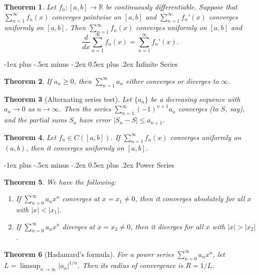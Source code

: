 \documentclass[10pt,landscape]{article}
\makeatletter
\newtheorem{theorem}{Theorem}
\theoremstyle{definition}
\newcommand{\R}{\mathbb{R}}
\renewcommand{\section}{\@startsection{section}{1}{0mm}%
                                {-1ex plus -.5ex minus -.2ex}%
                                {0.5ex plus .2ex}%
                                {\normalfont\large\bfseries}}
\makeatother
\begin{document}
\begin{multicols}{3}
\begin{theorem}
  Let $f_n : [a, b] \to \R$ be continuously differentiable.
  Suppose that $\sum_{n = 1}^\infty f_n(x)$ converges
  pointwise on $[a, b]$ and $\sum_{n = 1}^\infty f_n'(x)$ converges
  uniformly on $[a, b]$. Then
  $\sum_{n = 1}^\infty f_n(x)$ converges uniformly on $[a, b]$
  and
  \[
    \frac{d}{dx} \sum_{n = 1}^\infty f_n(x)
    = \sum_{n = 1}^\infty f_n'(x).
  \]
\end{theorem}

\section{Infinite Series}

\begin{theorem}
  If $a_n \ge 0$, then $\sum_{n = 1}^\infty a_n$
  either converges or diverges to $\infty$.
\end{theorem}

\begin{theorem}[Alternating series test]
  Let $\{a_n\}$ be a decreasing sequence with
  $a_n \to 0$ as $n \to \infty$. Then the series
  $\sum_{n = 1}^\infty (-1)^{n + 1} a_n$ converges (to $S$, say), and
  the partial sums $S_n$ have error
  $|S_n - S| \le a_{n + 1}$.
\end{theorem}

\begin{theorem}
  Let $f_n \in C([a, b])$. If $\sum_{n = 1}^\infty f_n(x)$
  converges uniformly on $(a, b)$, then it converges
  uniformly on $[a, b]$.
\end{theorem}

\section{Power Series}
\begin{theorem}
  We have the following:
  \begin{enumerate}
    \item If $\sum_{n = 0}^\infty a_n x^n$ converges
      at $x = x_1 \ne 0$, then it converges absolutely
      for all $x$ with $|x| < |x_1|$.
    \item If $\sum_{n = 0}^\infty a_n x^n$ diverges
      at $x = x_2 \ne 0$, then it diverges for all
      $x$ with $|x| > |x_2|$.
  \end{enumerate}
\end{theorem}

\begin{theorem}[Hadamard's formula]
  For a power series $\sum_{n = 0}^\infty a_n x^n$,
  let $L = \limsup_{n \to \infty} |a_n|^{1 / n}$.
  Then its radius of convergence is $R = 1 / L$.
\end{theorem}


\end{multicols}
\end{document}
